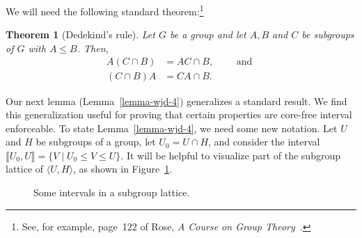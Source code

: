 \documentclass{gen-j-l}
\newcommand{\lb}{\ensuremath{\llbracket}}
\newcommand{\rb}{\ensuremath{\rrbracket}}
\newcommand{\<}{\ensuremath{\langle}}
\renewcommand{\>}{\ensuremath{\rangle}}
\theoremstyle{plain}
\newtheorem{theorem}{Theorem}[section]
\theoremstyle{definition}
\theoremstyle{remark}
\numberwithin{theorem}{section}
\numberwithin{claim}{section}
\numberwithin{equation}{section}
\numberwithin{conjecture}{section}
\renewcommand{\leq}{\ensuremath{\leqslant}}
\newcommand{\2}{\ensuremath{\mathbf{2}}}
\newcommand{\3}{\ensuremath{\mathbf{3}}}
\newcommand{\dotsize}{.8pt}
\begin{document}
We will need the following standard theorem:\footnote{See, for example, page~122
  of Rose, \emph{A Course on Group Theory}~\cite{Rose:1978}.} 
\begin{theorem}[Dedekind's rule]
  \label{lemma-dedekind}
Let $G$ be a group and let $A, B$ and $C$ be subgroups of $G$ with $A\leq B$.  Then,
\begin{align}
\label{eq:dedekind1}
A(C\cap B) &= AC \cap B,\qquad \text{ and }\\
\label{eq:dedekind2}
(C\cap B)A &= CA \cap B.
\end{align}
\end{theorem}

Our next lemma (Lemma~\ref{lemma-wjd-4}) generalizes a standard
result.  We find this generalization useful for proving that certain properties are
core-free interval enforceable.
To state Lemma~\ref{lemma-wjd-4}, we need some new notation.  
Let $U$ and $H$ be subgroups of a group,
let $U_0 = U\cap H$, and consider the interval $\lb U_0, U \rb=\{ V \mid U_0 \leq V
\leq U\}$.   
It will be helpful to visualize part of the subgroup lattice of
$\<U,H\>$, as shown in Figure~\ref{fig:intervals}.


\begin{figure}[!h]
\begin{center}
\end{center}
  \caption{Some intervals in a subgroup lattice.}
  \label{fig:intervals}
\end{figure}
\end{document}
